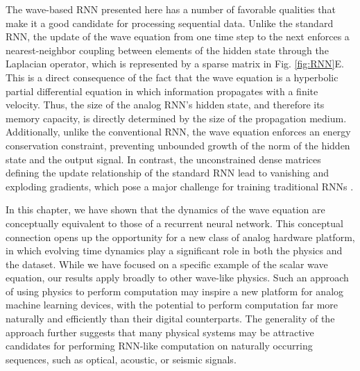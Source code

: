 The wave-based RNN presented here has a number of favorable qualities that make it a good candidate for processing sequential data.
Unlike the standard RNN, the update of the wave equation from one time step to the next enforces a nearest-neighbor coupling between elements of the hidden state through the Laplacian operator, which is represented by a sparse matrix in Fig. \ref{fig:RNN}E. 
This is a direct consequence of the fact that the wave equation is a hyperbolic partial differential equation in which information propagates with a finite velocity. 
Thus, the size of the analog RNN's hidden state, and therefore its memory capacity, is directly determined by the size of the propagation medium. 
Additionally, unlike the conventional RNN, the wave equation enforces an energy conservation constraint, preventing unbounded growth of the norm of the hidden state and the output signal.
In contrast, the unconstrained dense matrices defining the update relationship of the standard RNN lead to vanishing and exploding gradients, which pose a major challenge for training traditional RNNs \cite{jing2017tunable}.

In this chapter, we have shown that the dynamics of the wave equation are conceptually equivalent to those of a recurrent neural network.
This conceptual connection opens up the opportunity for a new class of analog hardware platform, in which evolving time dynamics play a significant role in both the physics and the dataset.
While we have focused on a specific example of the scalar wave equation, our results apply broadly to other wave-like physics.
Such an approach of using physics to perform computation \cite{silva_performing_2014, Hermans2015, guo_photonic_2018, lin2018all, kwon_nonlocal_2018, estakhri_inverse-designed_2019} may inspire a new platform for analog machine learning devices, with the potential to perform computation far more naturally and efficiently than their digital counterparts.
The generality of the approach further suggests that many physical systems may be attractive candidates for performing RNN-like computation on naturally occurring sequences, such as optical, acoustic, or seismic signals.
